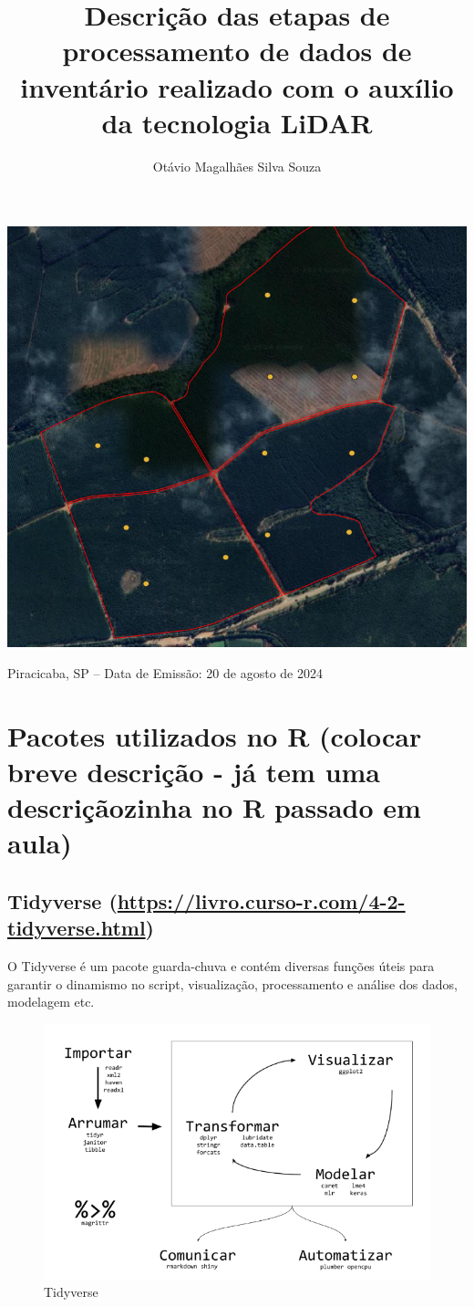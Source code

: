 \documentclass[
]{article}
\title{Descrição das etapas de processamento de dados de inventário
realizado com o auxílio da tecnologia LiDAR}
\author{Otávio Magalhães Silva Souza}
\date{}
\begin{document}
\maketitle

\begin{center}\includegraphics[width=0.4\linewidth]{IMAGES/CAPA} \end{center}

\centerline {Piracicaba, SP – Data de Emissão: 20 de agosto de 2024}
\newpage

\tableofcontents

\newpage

\section{Pacotes utilizados no R (colocar breve descrição - já tem uma
descriçãozinha no R passado em
aula)}\label{pacotes-utilizados-no-r-colocar-breve-descriuxe7uxe3o---juxe1-tem-uma-descriuxe7uxe3ozinha-no-r-passado-em-aula}

\subsection{\texorpdfstring{Tidyverse
(\url{https://livro.curso-r.com/4-2-tidyverse.html})}{Tidyverse (https://livro.curso-r.com/4-2-tidyverse.html)}}\label{tidyverse-httpslivro.curso-r.com4-2-tidyverse.html}

O Tidyverse é um pacote guarda-chuva e contém diversas funções úteis
para garantir o dinamismo no script, visualização, processamento e
análise dos dados, modelagem etc.

\begin{figure}

{\centering \includegraphics[width=0.6\linewidth]{IMAGES/tidyverse} 

}

\caption{Tidyverse}\label{fig:unnamed-chunk-2}
\end{figure}
\end{document}
